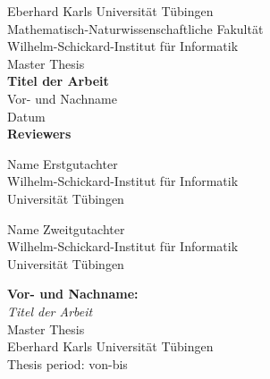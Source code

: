 \documentclass[acmsmall,nonacm,screen]{acmart}
\title{\thesisTitle} %
\newcommand{\authorName}{Vor- und Nachname}
\newcommand{\thesisTitle}{Titel der Arbeit}
\newcommand{\thesisDate}{Datum}
\begin{document}

\begin{titlepage}
 \begin{center}
  {\LARGE Eberhard Karls Universität Tübingen}\\
  {\large Mathematisch-Naturwissenschaftliche Fakultät \\
Wilhelm-Schickard-Institut für Informatik\\[4cm]}
  {\huge Master Thesis\\[2cm]}
  {\Large\bf  \thesisTitle\\[1.5cm]}
 {\large \authorName}\\[0.5cm]
\thesisDate\\[4cm]
{\small\bf Reviewers}\\[0.5cm]
  \parbox{7cm}%
  {\begin{center}{\large Name Erstgutachter}\\
    {\footnotesize Wilhelm-Schickard-Institut für Informatik\\
	  Universität Tübingen\vspace{0.4cm}}\end{center}}\hfill\parbox{7cm}%
  {\begin{center}
    {\large Name Zweitgutachter}\\
    {\footnotesize Wilhelm-Schickard-Institut für Informatik\\
	  Universität Tübingen}\end{center}
  }
  \end{center}
\end{titlepage}


\thispagestyle{empty}
\vspace*{\fill}
\begin{minipage}{11.2cm}
\textbf{\authorName:}\\
\emph{\thesisTitle}\\ Master Thesis\\
Eberhard Karls Universität Tübingen\\
Thesis period: von-bis
\end{minipage}
\newpage

\end{document}
